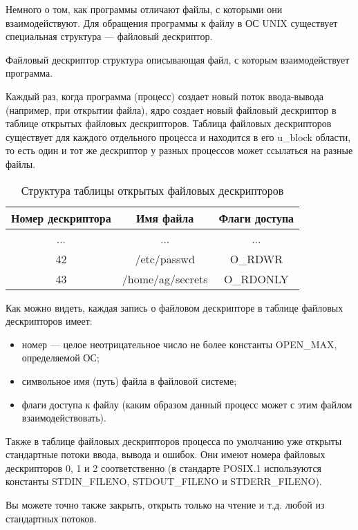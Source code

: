 Немного о том, как программы отличают файлы, с которыми они взаимодействуют. Для обращения программы к файлу в ОС UNIX существует специальная структура --- файловый дескриптор. 

\begin{defi}{Файловый дескриптор}
	структура описывающая файл, с которым взаимодействует программа.
\end{defi}

Каждый раз, когда программа (процесс) создает новый поток ввода-вывода (например, при открытии файла), ядро создает новый файловый дескриптор в таблице открытых файловых дескрипторов. Таблица файловых дескрипторов существует для каждого отдельного процесса и находится в его u\_block области, то есть один и тот же дескриптор у разных процессов может ссылаться на разные файлы.

\begin{center}
   \begin{table}[h]
	\begin{tabular}{c|c|c}
		\textbf{Номер дескриптора} & \textbf{Имя файла} & \textbf{Флаги доступа} \\
		\hline
		... & ... & ... \\
		\hline
		42 & /etc/passwd & O\_RDWR \\
		\hline
		43 & /home/ag/secrets & O\_RDONLY \\
	\end{tabular}

	\caption{Структура таблицы открытых файловых дескрипторов}
   \end{table}
\end{center}

Как можно видеть, каждая запись о файловом дескрипторе в таблице файловых дескрипторов имеет:

\begin{itemize}
	\item номер --- целое неотрицательное число не более константы OPEN\_MAX, определяемой ОС;
	\item символьное имя (путь) файла в файловой системе;
	\item флаги доступа к файлу (каким образом данный процесс может с этим файлом взаимодействовать).
\end{itemize}

\begin{important}
	Также в таблице файловых дескрипторов процесса по умолчанию уже открыты стандартные потоки ввода, вывода и ошибок. Они имеют номера файловых дескрипторов 0, 1 и 2 соответственно (в стандарте POSIX.1 используются константы STDIN\_FILENO, STDOUT\_FILENO и STDERR\_FILENO).

	Вы можете точно также закрыть, открыть только на чтение и т.д. любой из стандартных потоков.
\end{important}

